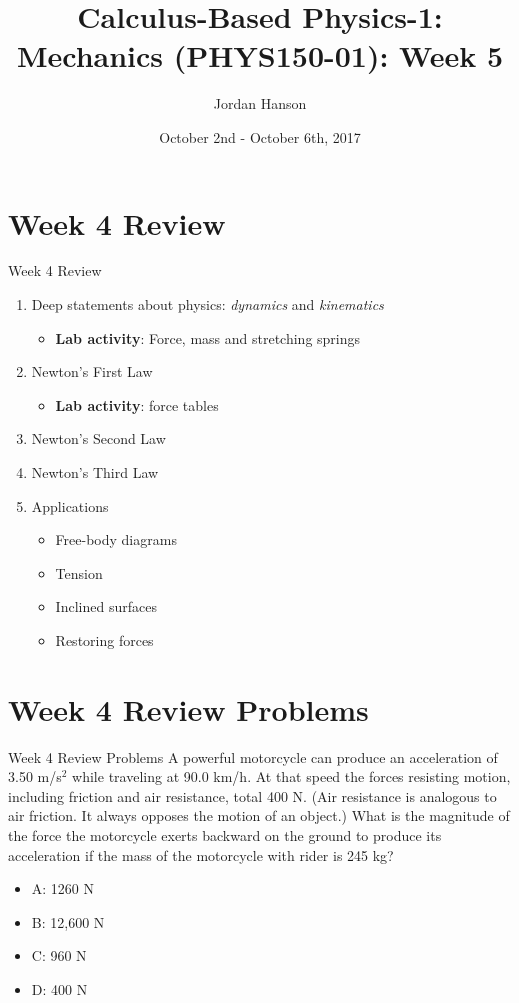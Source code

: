 \documentclass{beamer}
\title{Calculus-Based Physics-1: Mechanics (PHYS150-01): Week 5}
\date{October 2nd - October 6th, 2017}
\author{Jordan Hanson}
\institute{Whittier College Department of Physics and Astronomy}
\begin{document}
\maketitle

\section{Week 4 Review}

\begin{frame}{Week 4 Review}
\begin{enumerate}
\item Deep statements about physics: \textit{dynamics} and \textit{kinematics}
\begin{itemize}
\item \textbf{Lab activity}: Force, mass and stretching springs
\end{itemize}
\item Newton's \alert{First Law}
\begin{itemize}
\item \textbf{Lab activity}: force tables
\end{itemize}
\item Newton's \alert{Second Law}
\item Newton's \alert{Third Law}
\item Applications
\begin{itemize}
\item Free-body diagrams
\item Tension
\item Inclined surfaces
\item Restoring forces
\end{itemize}
\end{enumerate}
\end{frame}

\section{Week 4 Review Problems}

\begin{frame}{Week 4 Review Problems}
A powerful motorcycle can produce an acceleration of 3.50 m/s$^2$ while traveling at 90.0 km/h. At that speed the forces resisting motion, including friction and air resistance, total 400 N. (Air resistance is analogous to air friction. It always opposes the motion of an object.) What is the magnitude of the force the motorcycle exerts backward on the ground to produce its acceleration if the mass of the motorcycle with rider is 245 kg?
\begin{itemize}
\item A: 1260 N
\item B: 12,600 N
\item C: 960 N
\item D: 400 N
\end{itemize}
\end{frame}
\end{document}
